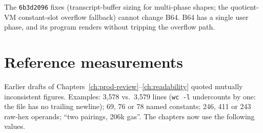 \noindent The \texttt{6b3d2096} fixes (transcript-buffer sizing for
multi-phase shapes; the quotient-VM constant-slot overflow fallback) cannot
change B64. B64 has a single user phase, and its program renders without
tripping the overflow path.

\section{Reference measurements}
\label{sec:vp-metrics}

Earlier drafts of Chapters~\ref{ch:prod-review}--\ref{ch:readability}
quoted mutually inconsistent figures. Examples: 3{,}578 vs.\ 3{,}579 lines (\texttt{wc -l} undercounts by one: the file has no trailing newline);
69, 76 or 78 named constants; 246, 411 or 243 raw-hex operands; ``two
pairings, 206k gas''. The chapters now use the following values.


